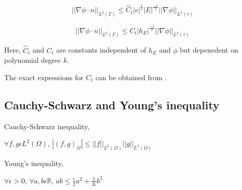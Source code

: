 \documentclass[a4paper,12pt]{book}
\begin{document}
\begin{equation}
||\nabla \phi \cdot n||_{L^2(\Gamma)} \leq \hat{C}_t |e|^{\frac{1}{2}} |E|^{\frac{-1}{2}} ||\nabla \phi||_{L^2(\tau)}
\end{equation}

\begin{equation}
||\nabla \phi \cdot n||_{L^2(\Gamma)} \leq {C}_t |h_E|^{\frac{-1}{2}} ||\nabla \phi||_{L^2(\tau)}
\end{equation}

Here, $\hat{C}_t$ and ${C}_t$ are constants independent of $h_E$ and $\phi$ but depenedent on polynomial degree $k$.

The exact expressions for $C_t$ can be obtained from \cite{warburton}.

\subsection{Cauchy-Schwarz and Young's inequality}\cite{riviere}

Cauchy-Schwarz inequality,\\
\begin{center}
$\forall f,g \epsilon L^2(\Omega)$, $|(f,g)_{\Omega}| \leq ||f||_{L^2(\Omega)} ||g||_{L^2(\Omega)}$ \\
\end{center}

Young's inequality,\\
\begin{center}
$\forall \epsilon > 0$, $\forall a,b \epsilon \mathbb{R}$, $ab \leq \frac{\epsilon}{2}a^2 + \frac{1}{2 \epsilon}b^2$\\
\end{center}



\end{document}
